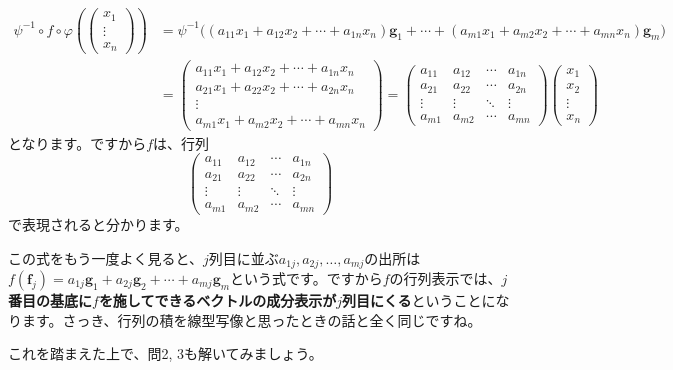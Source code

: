 \begin{align*}
\psi^{-1} \circ f\circ \varphi
\left(
\begin{pmatrix}
x_1 \\
\vdots \\
x_n
\end{pmatrix}
\right)
&=\psi^{-1}\bigl((a_{11} x_1 + a_{12} x_2 + \cdots + a_{1n} x_n)\bm{g}_1 + \cdots + (a_{m1} x_1 + a_{m2} x_2 + \cdots + a_{mn} x_n)\bm{g}_m \bigr) \\
&= 
\begin{pmatrix}
a_{11} x_1 + a_{12} x_2 + \cdots + a_{1n} x_n \\
a_{21} x_1 + a_{22} x_2 + \cdots + a_{2n} x_n \\
\vdots \\
a_{m1} x_1 + a_{m2} x_2 + \cdots + a_{mn} x_n
\end{pmatrix}
=
\begin{pmatrix}
a_{11} & a_{12} & \cdots & a_{1n} \\
a_{21} & a_{22} & \cdots & a_{2n} \\
\vdots & \vdots & \ddots & \vdots \\
a_{m1} & a_{m2} & \cdots & a_{mn}
\end{pmatrix}
\begin{pmatrix}
x_1 \\
x_2 \\
\vdots \\
x_n
\end{pmatrix}
\end{align*}
となります。ですから$f$は、行列
\[
\begin{pmatrix}
a_{11} & a_{12} & \cdots & a_{1n} \\
a_{21} & a_{22} & \cdots & a_{2n} \\
\vdots & \vdots & \ddots & \vdots \\
a_{m1} & a_{m2} & \cdots & a_{mn}
\end{pmatrix}
\]
で表現されると分かります。

この式をもう一度よく見ると、$j$列目に並ぶ$a_{1j}, a_{2j}, \ldots, a_{mj}$の出所は$f(\bm{f}_j) = a_{1j} \bm{g}_1 + a_{2j} \bm{g}_2 + \cdots + a_{mj} \bm{g}_m$という式です。ですから$f$の行列表示では、\textbf{$j$番目の基底に$f$を施してできるベクトルの成分表示が$j$列目にくる}ということになります。さっき、行列の積を線型写像と思ったときの話と全く同じですね。

これを踏まえた上で、問2, 3も解いてみましょう。


